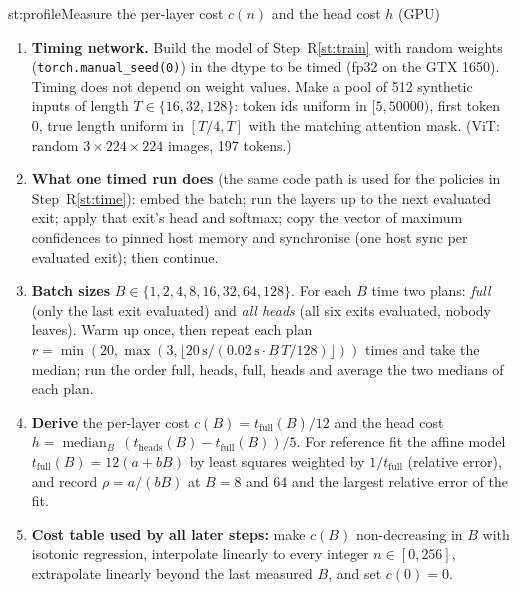\begin{step}{st:profile}{Measure the per-layer cost $c(n)$ and the head cost $h$ (GPU)}
\begin{enumerate}
  \item \textbf{Timing network.} Build the model of Step~R\ref{st:train} with random weights (\texttt{torch.manual\_seed(0)})
  in the dtype to be timed (fp32 on the GTX 1650). Timing does not depend on weight values. Make a pool of 512
  synthetic inputs of length $T\in\{16,32,128\}$: token ids uniform in $[5, 50000)$, first token 0, true length
  uniform in $[T/4, T]$ with the matching attention mask. (ViT: random $3\times224\times224$ images, 197 tokens.)
  \item \textbf{What one timed run does} (the same code path is used for the policies in Step~R\ref{st:time}): embed
  the batch; run the layers up to the next evaluated exit; apply that exit's head and softmax; copy the vector of
  maximum confidences to pinned host memory and synchronise (one host sync per evaluated exit); then continue.
  \item \textbf{Batch sizes} $B\in\{1,2,4,8,16,32,64,128\}$. For each $B$ time two plans: \emph{full} (only the last
  exit evaluated) and \emph{all heads} (all six exits evaluated, nobody leaves). Warm up once, then repeat each plan
  $r=\min(20,\max(3,\lfloor 20\,\text{s}/(0.02\,\text{s}\cdot B\,T/128)\rfloor))$ times and take the median; run
  the order full, heads, full, heads and average the two medians of each plan.
  \item \textbf{Derive} the per-layer cost $c(B) = t_{\text{full}}(B)/12$ and the head cost
  $h=\operatorname{median}_B\,(t_{\text{heads}}(B)-t_{\text{full}}(B))/5$. For reference fit the affine model
  $t_{\text{full}}(B)=12(a+bB)$ by least squares weighted by $1/t_{\text{full}}$ (relative error), and record
  $\rho=a/(bB)$ at $B=8$ and 64 and the largest relative error of the fit.
  \item \textbf{Cost table used by all later steps:} make $c(B)$ non-decreasing in $B$ with isotonic regression,
  interpolate linearly to every integer $n\in[0,256]$, extrapolate linearly beyond the last measured $B$, and set
  $c(0)=0$.
\end{enumerate}
\end{step}

